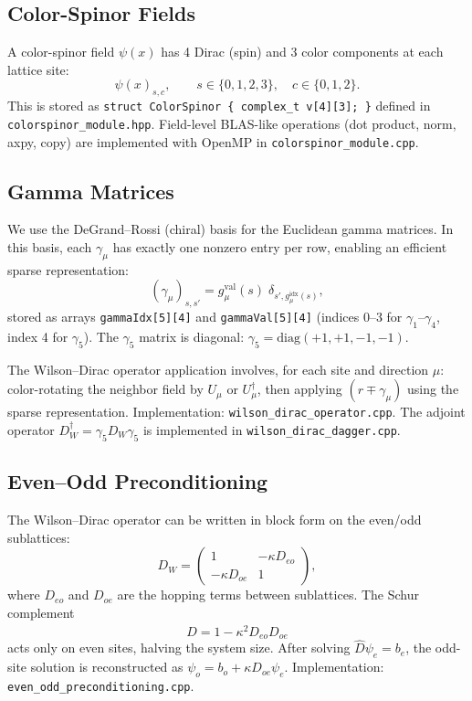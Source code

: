 \documentclass[12pt]{article}
\newcommand{\code}[1]{\texttt{#1}}
\begin{document}
\subsection{Color-Spinor Fields}

A color-spinor field $\psi(x)$ has 4 Dirac (spin) and 3 color components at each lattice site:
\begin{equation}
\psi(x)_{s,c}, \qquad s \in \{0,1,2,3\}, \quad c \in \{0,1,2\}.
\end{equation}
This is stored as \code{struct ColorSpinor \{ complex\_t v[4][3]; \}} defined in \code{colorspinor\_module.hpp}. Field-level BLAS-like operations (dot product, norm, axpy, copy) are implemented with OpenMP in \code{colorspinor\_module.cpp}.

\subsection{Gamma Matrices}

We use the DeGrand--Rossi (chiral) basis for the Euclidean gamma matrices. In this basis, each $\gamma_\mu$ has exactly one nonzero entry per row, enabling an efficient sparse representation:
\begin{equation}
(\gamma_\mu)_{s,s'} = g_\mu^{\mathrm{val}}(s) \; \delta_{s', g_\mu^{\mathrm{idx}}(s)},
\end{equation}
stored as arrays \code{gammaIdx[5][4]} and \code{gammaVal[5][4]} (indices 0--3 for $\gamma_1$--$\gamma_4$, index 4 for $\gamma_5$). The $\gamma_5$ matrix is diagonal: $\gamma_5 = \mathrm{diag}(+1, +1, -1, -1)$.

The Wilson--Dirac operator application involves, for each site and direction $\mu$: color-rotating the neighbor field by $U_\mu$ or $U_\mu^\dagger$, then applying $(r \mp \gamma_\mu)$ using the sparse representation. Implementation: \code{wilson\_dirac\_operator.cpp}. The adjoint operator $D_W^\dagger = \gamma_5 D_W \gamma_5$ is implemented in \code{wilson\_dirac\_dagger.cpp}.

\subsection{Even--Odd Preconditioning}

The Wilson--Dirac operator can be written in block form on the even/odd sublattices:
\begin{equation}
D_W = \begin{pmatrix} 1 & -\kappa D_{eo} \\ -\kappa D_{oe} & 1 \end{pmatrix},
\end{equation}
where $D_{eo}$ and $D_{oe}$ are the hopping terms between sublattices. The Schur complement
\begin{equation}
\hat{D} = 1 - \kappa^2 D_{eo} D_{oe}
\end{equation}
acts only on even sites, halving the system size. After solving $\hat{D} \psi_e = b_e$, the odd-site solution is reconstructed as $\psi_o = b_o + \kappa D_{oe} \psi_e$. Implementation: \code{even\_odd\_preconditioning.cpp}.
\end{document}
